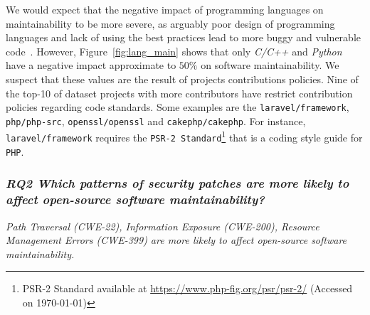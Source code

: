 \documentclass[10pt,conference]{IEEEtran}
\begin{document}
We would expect that the negative impact of programming languages on
maintainability to be more severe, as arguably poor design of programming
languages and lack of using the best practices lead to more buggy and vulnerable
code~\cite{Ray:2017:LSP:3144574.3126905, 2019arXiv190110220B}. However,
Figure~\ref{fig:lang_main} shows that only \emph{C/C++} and \emph{Python} have a negative impact approximate to $50\%$ on software maintainability. We suspect that these values are
the result of projects contributions policies. Nine of the top-10 of dataset projects 
with more contributors have restrict contribution policies regarding code
standards. Some examples are the \texttt{laravel/framework},
\texttt{php/php-src}, \texttt{openssl/openssl} and \texttt{cakephp/cakephp}. For
instance, \texttt{laravel/framework} requires the \texttt{PSR-2
Standard}\footnote{PSR-2 Standard available at
\url{https://www.php-fig.org/psr/psr-2/} (Accessed on \today{})} that is a coding style guide for \texttt{PHP}.

\subsubsection*{\textit{\textbf{RQ2} \textbf{Which patterns of security patches are more likely to
affect open-source software maintainability?}}}


\textit{Path Traversal (CWE-22), Information Exposure (CWE-200), Resource Management Errors (CWE-399) are more likely to affect
open-source software maintainability.}
\end{document}
